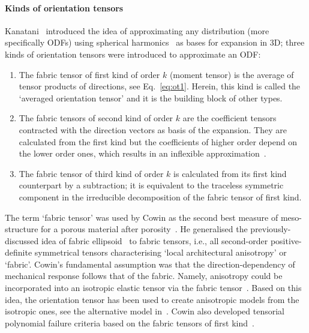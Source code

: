 	\paragraph{Kinds of orientation tensors} Kanatani~\autocite{Kanatani.1984} introduced the idea of approximating any distribution (more specifically ODFs) using spherical harmonics~\autocite{Jones.1985} as bases for expansion in 3D; three kinds of orientation tensors were introduced to approximate an ODF:
	\begin{enumerate}
		\item The fabric tensor of first kind of order $k$ (moment tensor) is the average of tensor products of directions, see Eq.~\eqref{eq:ot1}. Herein, this kind is called the `averaged orientation tensor' and it is the building block of other types.
		\item The fabric tensors of second kind of order $k$ are the coefficient tensors contracted with the direction vectors as basis of the expansion. They are calculated from the first kind but the coefficients of higher order depend on the lower order ones, which results in an inflexible approximation~\autocite{Kanatani.1984}.
%		
		\item The fabric tensor of third kind of order $k$ is calculated from its first kind counterpart by a subtraction; it is equivalent to the traceless symmetric component in the irreducible decomposition of the fabric tensor of first kind.
	\end{enumerate}	
		
	The term `fabric tensor' was used by Cowin as the second best measure of meso-structure for a porous material after porosity~\autocite{Cowin.1985}. He generalised the previously-discussed idea of fabric ellipsoid~\autocite{Oda.1980} to fabric tensors, i.e., all second-order positive-definite symmetrical tensors characterising `local architectural anisotropy' or `fabric'. Cowin's fundamental assumption was that the direction-dependency of mechanical response follows that of the fabric. Namely, anisotropy could be incorporated into an isotropic elastic tensor via the fabric tensor~\autocite{Shertzer.2011}. Based on this idea, the orientation tensor has been used to create anisotropic models from the isotropic ones, see the alternative model in~\autocite{Zysset.1995}. Cowin also developed tensorial polynomial failure criteria based on the fabric tensors of first kind~\autocite{Cowin.1986}. 

